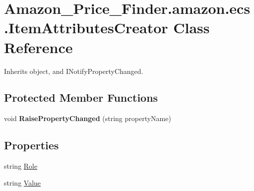 \hypertarget{class_amazon___price___finder_1_1amazon_1_1ecs_1_1_item_attributes_creator}{\section{Amazon\-\_\-\-Price\-\_\-\-Finder.\-amazon.\-ecs.\-Item\-Attributes\-Creator Class Reference}
\label{class_amazon___price___finder_1_1amazon_1_1ecs_1_1_item_attributes_creator}
}


 




Inherits object, and I\-Notify\-Property\-Changed.

\subsection*{Protected Member Functions}
\begin{DoxyCompactItemize}
\item 
\hypertarget{class_amazon___price___finder_1_1amazon_1_1ecs_1_1_item_attributes_creator_a8e3f02ccc2e0ea3e6583295cca7ed59e}{void {\bfseries Raise\-Property\-Changed} (string property\-Name)}\label{class_amazon___price___finder_1_1amazon_1_1ecs_1_1_item_attributes_creator_a8e3f02ccc2e0ea3e6583295cca7ed59e}

\end{DoxyCompactItemize}
\subsection*{Properties}
\begin{DoxyCompactItemize}
\item 
\hypertarget{class_amazon___price___finder_1_1amazon_1_1ecs_1_1_item_attributes_creator_a0386fc29addfcaa31e2d9e84b3a3df21}{string \hyperlink{class_amazon___price___finder_1_1amazon_1_1ecs_1_1_item_attributes_creator_a0386fc29addfcaa31e2d9e84b3a3df21}{Role}}\label{class_amazon___price___finder_1_1amazon_1_1ecs_1_1_item_attributes_creator_a0386fc29addfcaa31e2d9e84b3a3df21}

\begin{DoxyCompactList}\small\item\em \end{DoxyCompactList}\item 
\hypertarget{class_amazon___price___finder_1_1amazon_1_1ecs_1_1_item_attributes_creator_a7231cba6a0d5e204feededa7bda9fac1}{string \hyperlink{class_amazon___price___finder_1_1amazon_1_1ecs_1_1_item_attributes_creator_a7231cba6a0d5e204feededa7bda9fac1}{Value}}\label{class_amazon___price___finder_1_1amazon_1_1ecs_1_1_item_attributes_creator_a7231cba6a0d5e204feededa7bda9fac1}

\begin{DoxyCompactList}\small\item\em \end{DoxyCompactList}\end{DoxyCompactItemize}
